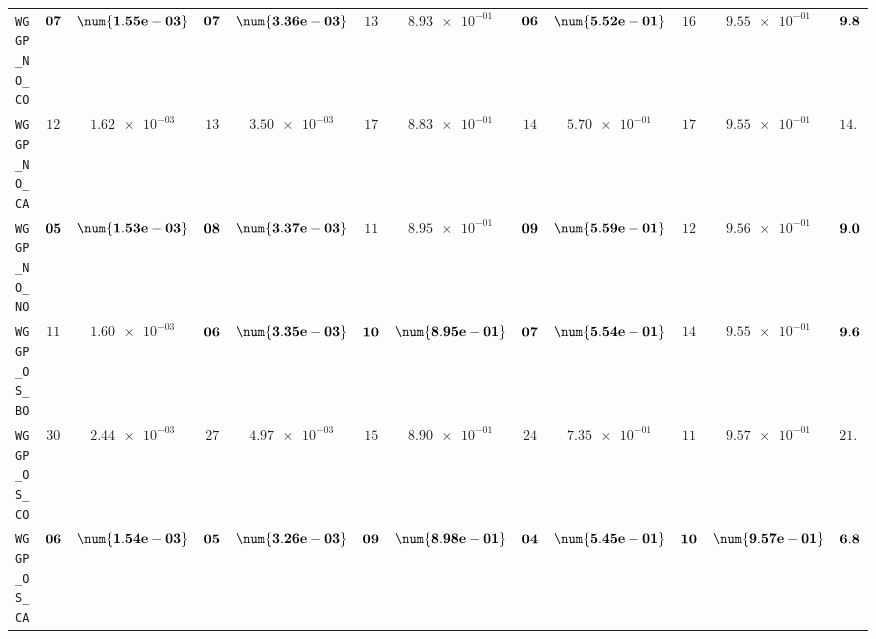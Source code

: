 \begin{table}[H]
\begin{tabularx}{\textwidth}{l||cC|cC|cC|cC|cC||c}
		\texttt{WGGP\_NO\_CO} & $\bf 07$ & $\bf \num{1.55e-03}$ & $\bf 07$ & $\bf \num{3.36e-03}$ & $ 13$ & $ \num{8.93e-01}$ & $\bf 06$ & $\bf \num{5.52e-01}$ & $ 16$ & $ \num{9.55e-01}$ & $\bf 9.8$  \\
		\texttt{WGGP\_NO\_CA} & $ 12$ & $ \num{1.62e-03}$ & $ 13$ & $ \num{3.50e-03}$ & $ 17$ & $ \num{8.83e-01}$ & $ 14$ & $ \num{5.70e-01}$ & $ 17$ & $ \num{9.55e-01}$ & $ 14.6$  \\
		\texttt{WGGP\_NO\_NO} & $\bf 05$ & $\bf \num{1.53e-03}$ & $\bf 08$ & $\bf \num{3.37e-03}$ & $ 11$ & $ \num{8.95e-01}$ & $\bf 09$ & $\bf \num{5.59e-01}$ & $ 12$ & $ \num{9.56e-01}$ & $\bf 9.0$  \\
		\texttt{WGGP\_OS\_BO} & $ 11$ & $ \num{1.60e-03}$ & $\bf 06$ & $\bf \num{3.35e-03}$ & $\bf 10$ & $\bf \num{8.95e-01}$ & $\bf 07$ & $\bf \num{5.54e-01}$ & $ 14$ & $ \num{9.55e-01}$ & $\bf 9.6$  \\
		\texttt{WGGP\_OS\_CO} & $ 30$ & $ \num{2.44e-03}$ & $ 27$ & $ \num{4.97e-03}$ & $ 15$ & $ \num{8.90e-01}$ & $ 24$ & $ \num{7.35e-01}$ & $ 11$ & $ \num{9.57e-01}$ & $ 21.4$  \\
		\texttt{WGGP\_OS\_CA} & $\bf 06$ & $\bf \num{1.54e-03}$ & $\bf 05$ & $\bf \num{3.26e-03}$ & $\bf 09$ & $\bf \num{8.98e-01}$ & $\bf 04$ & $\bf \num{5.45e-01}$ & $\bf 10$ & $\bf \num{9.57e-01}$ & $\bf 6.8$  \\

\end{tabularx}
\end{table}
